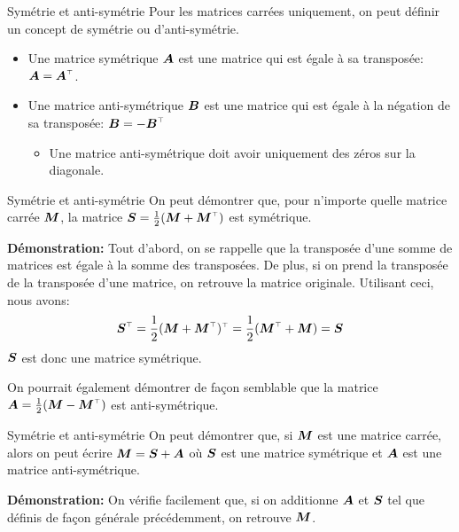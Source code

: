 \documentclass[french]{beamer}
\begin{document}
\begin{frame}{Symétrie et anti-symétrie}
Pour les matrices carrées uniquement, on peut définir un concept de symétrie
ou d'anti-symétrie.
\begin{itemize}
\item Une matrice symétrique $\boldsymbol{A}$ est une matrice qui est égale à sa transposée: $\matA = \transp{\matA}$.
\item Une matrice anti-symétrique $\boldsymbol{B}$ est une matrice qui est égale à la 
négation de sa transposée: $\matB = - \transp{\matB}$
\begin{itemize}
\item Une matrice anti-symétrique doit avoir uniquement des zéros sur la
diagonale.
\end{itemize}
\end{itemize}
\end{frame}

\begin{frame}{Symétrie et anti-symétrie}
On peut démontrer que, pour n'importe quelle matrice carrée $\boldsymbol{M}$, la matrice $\mat{S} = \frac{1}{2}(\matM + \transp{\matM})$ est symétrique.

\textbf{Démonstration:}
Tout d'abord, on se rappelle que la transposée d'une somme de matrices est égale 
à la somme des transposées. De plus, si on prend la transposée de la transposée d'une matrice, on retrouve
la matrice originale.  Utilisant ceci, nous avons:
\[
	\transp{\mat{S}} = \frac{1}{2}\transp{(\matM + \transp{\matM})} = \frac{1}{2}(\transp{\matM} + \matM) = \mat{S}
\]
	$\boldsymbol{S}$ est donc une matrice symétrique.
	
	On pourrait également démontrer de façon semblable que la matrice $\matA=\frac{1}{2}(\matM - \transp{\matM})$ est anti-symétrique.
\end{frame}

\begin{frame}{Symétrie et anti-symétrie}
On peut démontrer que, si $\boldsymbol{M}$ est une matrice carrée, alors on peut écrire $\boldsymbol{M} = \boldsymbol{S} + \boldsymbol{A}$ où $\boldsymbol{S}$ est une matrice symétrique
et $\boldsymbol{A}$ est une matrice anti-symétrique.



\textbf{Démonstration:}
 On vérifie facilement que, si on additionne $\boldsymbol{A}$ et $\boldsymbol{S}$ tel que définis 
 de façon générale précédemment, on retrouve $\boldsymbol{M}$.

\end{frame}
\end{document}
